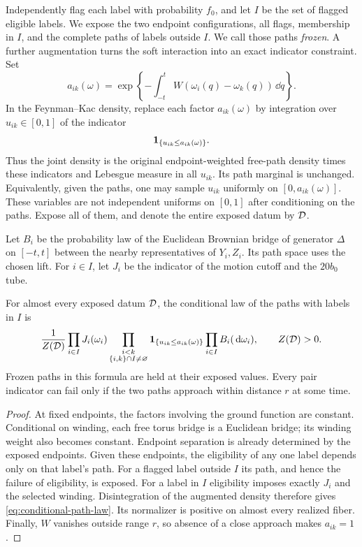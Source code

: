 Independently flag each label with probability $f_0$, and let $I$ be the
set of flagged eligible labels.  We expose the two endpoint
configurations, all flags, membership in $I$, and the complete paths of
labels outside $I$.  We call those paths \emph{frozen}.  A further
augmentation turns the soft interaction into an exact indicator
constraint.  Set
\[
 a_{ik}(\omega)=\exp\left\{-\int_{-t}^t
                   W(\omega_i(q)-\omega_k(q))\,\dd q\right\}.
\]
In the Feynman--Kac density, replace each factor $a_{ik}(\omega)$ by
integration over $u_{ik}\in[0,1]$ of the indicator
\begin{equation}\label{eq:soft-check}
                    \mathbf 1_{\{u_{ik}\le a_{ik}(\omega)\}}.
\end{equation}
Thus the joint density is the original endpoint-weighted free-path
density times these indicators and Lebesgue measure in all $u_{ik}$.
Its path marginal is unchanged.  Equivalently, given the paths, one may
sample $u_{ik}$ uniformly on $[0,a_{ik}(\omega)]$.  These variables are
not independent uniforms on $[0,1]$ after conditioning on the paths.
Expose all of them, and denote the entire exposed datum by $\mathcal D$.

Let $B_i$ be the probability law of the Euclidean Brownian bridge of
generator $\Delta$ on $[-t,t]$ between the nearby representatives of
$Y_i,Z_i$.  Its path space uses the chosen lift.  For $i\in I$, let $J_i$
be the indicator of the motion cutoff and the $20b_0$ tube.

\begin{lemma}\label{lem:conditional-path-law}
For almost every exposed datum $\mathcal D$, the conditional law of the paths
with labels in $I$ is
\begin{equation}\label{eq:conditional-path-law}
 \frac1{Z(\mathcal D)}\prod_{i\in I}J_i(\omega_i)
 \prod_{\substack{i<k\\\{i,k\}\cap I\ne\varnothing}}
       \mathbf 1_{\{u_{ik}\le a_{ik}(\omega)\}}
                    \prod_{i\in I}B_i(\,\mathrm d\omega_i),
 \qquad Z(\mathcal D)>0.
\end{equation}
Frozen paths in this formula are held at their exposed values.  Every
pair indicator can fail only if the two paths approach within distance
$r$ at some time.
\end{lemma}

\begin{proof}
At fixed endpoints, the factors involving the ground function are
constant.  Conditional on winding, each free torus bridge is a
Euclidean bridge; its winding weight also becomes constant.  Endpoint
separation is already determined by the exposed endpoints.  Given these
endpoints, the eligibility of any one label depends only on that label's
path.  For a flagged label outside $I$ its path, and hence the failure of
eligibility, is exposed.  For a label in $I$ eligibility imposes exactly
$J_i$ and the selected winding.  Disintegration of the augmented density
therefore gives \eqref{eq:conditional-path-law}.  Its normalizer is
positive on almost every realized fiber.  Finally, $W$ vanishes outside
range $r$, so absence of a close approach makes $a_{ik}=1$.
\end{proof}

